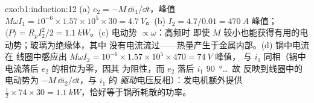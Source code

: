 \begin{solution}{exo:b1:induction:12}
(a) $e_2 = -M\,\dd i_1/\dd t$，峰值 $M\omega I_1 = 10^{-6} \times 1.57 \times 10^5 \times 30 =
\qty{4.7}{V}$。(b) $I_2 = 4.7/0.01 = \qty{470}{A}$ 峰值；$\langle P\rangle = R_pI_2^2/2
= \qty{1.1}{kW}$。(c) 电动势 $\propto\omega$：高频时
即使 $M$ 较小也能获得有用的电动势；玻璃为绝缘体，其中
没有电流流过——热量产生于金属内部。(d) 锅中电流在
线圈中感应出 $M\omega I_2 = 10^{-6} \times 1.57 \times 10^5 \times 470 = \qty{74}{V}$ 峰值，
与 $i_1$ 同相（锅中电流落后 $e_2$ 的相位为零，因其
为阻性，而 $e_2$ 落后 $i_1$ \qty{90}{\degree}\ldots\ 故
反映到线圈中的电动势为 $-M\,\dd i_2/\dd t$，与 $i_1$ 的
\emph{驱动}电压反相）：发电机额外提供 $\tfrac12 \times 74 \times 30 =
\qty{1.1}{kW}$，恰好等于锅所耗散的功率。
\end{solution}

